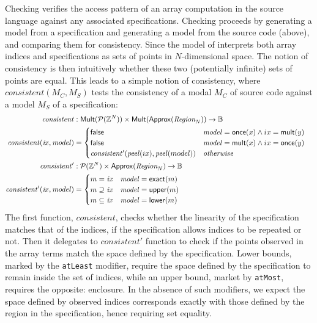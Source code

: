 \noindent
Checking verifies the access pattern of an array computation in the
source language against any associated specifications. Checking
proceeds by generating a model from a specification and generating a
model from the source code (above), and comparing them for
consistency.  Since the model of  interprets both
array indices and specifications as sets of points in $N$-dimensional
space. The notion of consistency is then intuitively whether these two
(potentially infinite) sets of points are equal. This leads to a
simple notion of consistency, where $\mathit{consistent}(M_C, M_S)$
tests the consistency of a modal $M_C$ of source code against
a model $M_S$ of a specification:
%
\begin{align*}
  \mathit{consistent} & :
    \mathsf{Mult}(\mathcal{P}(\bz{}^N)) \times
    \mathsf{Mult}(\mathsf{Approx}(\region{N})) \to \mathbb{B} & \\
%
  \mathit{consistent}(\mathit{ix}, \mathit{model}) & = \begin{cases}
    \mathsf{false} & \mathit{model} = \mathsf{once}(x) \wedge ix =
    \mathsf{mult}(y) \\
    \mathsf{false} & \mathit{model} = \mathsf{mult}(x) \wedge ix = \mathsf{once}(y) \\
    \mathit{consistent'}(\mathit{peel}(ix), \mathit{peel}(model)) & \textit{otherwise}
  \end{cases} \\
%
  \mathit{consistent'} & :
    \mathcal{P}(\bz{}^N) \times
    \mathsf{Approx}(\region{N}) \to \mathbb{B} & \\
%
  \mathit{consistent'}(\mathit{ix}, \mathit{model}) & = \begin{cases}
    m = \mathit{ix} & \mathit{model} = \mathsf{exact}(m) \\
    m \supseteq \mathit{ix} & \mathit{model} = \mathsf{upper}(m) \\
    m \subseteq \mathit{ix} & \mathit{model} = \mathsf{lower}(m)
  \end{cases}
\end{align*}
%
The first function, $\mathit{consistent}$, checks whether the linearity of the
specification matches that of the indices, \ie{} if the specification allows
indices to be repeated or not. Then it delegates to $\mathit{consistent'}$
function to check if the points observed in the array terms match the space
defined by the specification. Lower bounds, marked by the \texttt{atLeast}
modifier, require the space defined by the specification to remain inside the
set of indices, while an upper bound, market by \texttt{atMost},
requires the opposite: enclosure. In the absence of such modifiers, we expect
the space defined by observed indices corresponds exactly with those defined by the
region in the specification, hence requiring set equality.

